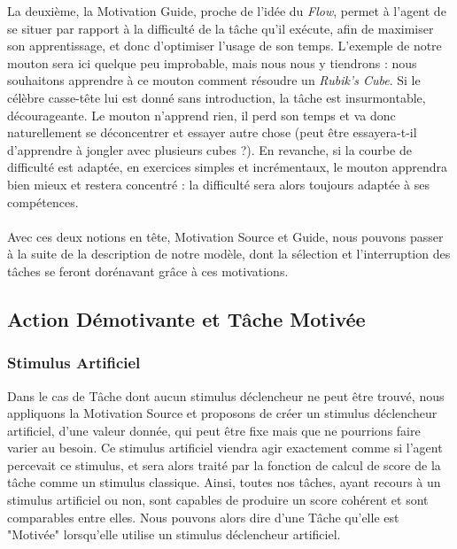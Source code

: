         La deuxième, la Motivation Guide, proche de l'idée du \textit{Flow}, permet à l'agent de se situer par rapport à la difficulté de la tâche qu'il exécute, afin de maximiser son apprentissage, et donc d'optimiser l'usage de son temps. L'exemple de notre mouton sera ici quelque peu improbable, mais nous nous y tiendrons : nous souhaitons apprendre à ce mouton comment résoudre un \textit{Rubik's Cube}. Si le célèbre casse-tête lui est donné sans introduction, la tâche est insurmontable, décourageante. Le mouton n'apprend rien, il perd son temps et va donc naturellement se déconcentrer et essayer autre chose (peut être essayera-t-il d'apprendre à jongler avec plusieurs cubes ?). En revanche, si la courbe de difficulté est adaptée, en exercices simples et incrémentaux, le mouton apprendra bien mieux et restera concentré : la difficulté sera alors toujours adaptée à ses compétences.
        
        \paragraph{}
        Avec ces deux notions en tête, Motivation Source et Guide, nous pouvons passer à la suite de la description de notre modèle, dont la sélection et l'interruption des tâches se feront dorénavant grâce à ces motivations.
        
        
		\subsection{Action Démotivante et Tâche Motivée}
		\label{sectionInterruption}
		
		\subsubsection{Stimulus Artificiel}
			Dans le cas de Tâche dont aucun stimulus déclencheur ne peut être trouvé, nous appliquons la Motivation Source et proposons de créer un stimulus déclencheur artificiel, d'une valeur donnée, qui peut être fixe mais que ne pourrions faire varier au besoin. Ce stimulus artificiel viendra agir exactement comme si l'agent percevait ce stimulus, et sera alors traité par la fonction de calcul de score de la tâche comme un stimulus classique. Ainsi, toutes nos tâches, ayant recours à un stimulus artificiel ou non, sont capables de produire un score cohérent et sont comparables entre elles. Nous pouvons alors dire d'une Tâche qu'elle est "Motivée" lorsqu'elle utilise un stimulus déclencheur artificiel.
			
